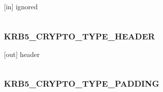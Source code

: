 \documentclass[letterpaper,10pt,english]{sphinxmanual}
\begin{document}
\begin{fulllineitems}
\label{appdev/refs/macros/KRB5_CRYPTO_TYPE_EMPTY:KRB5_CRYPTO_TYPE_EMPTY}
\end{fulllineitems}


{[}in{]} ignored

\begin{tabulary}{\linewidth}{|L|L|}
\hline

 & 
\\\hline
\end{tabulary}



\subsubsection{KRB5\_CRYPTO\_TYPE\_HEADER}
\label{appdev/refs/macros/KRB5_CRYPTO_TYPE_HEADER:krb5-crypto-type-header}\label{appdev/refs/macros/KRB5_CRYPTO_TYPE_HEADER:krb5-crypto-type-header-data}\label{appdev/refs/macros/KRB5_CRYPTO_TYPE_HEADER::doc}

\begin{fulllineitems}
\label{appdev/refs/macros/KRB5_CRYPTO_TYPE_HEADER:KRB5_CRYPTO_TYPE_HEADER}
\end{fulllineitems}


{[}out{]} header

\begin{tabulary}{\linewidth}{|L|L|}
\hline

 & 
\\\hline
\end{tabulary}



\subsubsection{KRB5\_CRYPTO\_TYPE\_PADDING}
\label{appdev/refs/macros/KRB5_CRYPTO_TYPE_PADDING::doc}\label{appdev/refs/macros/KRB5_CRYPTO_TYPE_PADDING:krb5-crypto-type-padding-data}\label{appdev/refs/macros/KRB5_CRYPTO_TYPE_PADDING:krb5-crypto-type-padding}

\begin{fulllineitems}
\label{appdev/refs/macros/KRB5_CRYPTO_TYPE_PADDING:KRB5_CRYPTO_TYPE_PADDING}
\end{fulllineitems}
\end{document}
